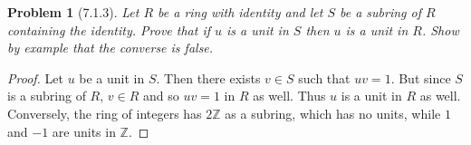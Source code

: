 \documentclass{article}
\newtheorem{problem}{Problem}
\begin{document}

\begin{problem}[7.1.3]
Let $R$ be a ring with identity and let $S$ be a subring of $R$ containing the identity. Prove that if $u$ is a unit in $S$ then $u$ is a unit in $R$. Show by example that the converse is false.
\end{problem}
\begin{proof}
Let $u$ be a unit in $S$. Then there exists $v \in S$ such that $uv = 1$. But since $S$ is a subring of $R$, $v \in R$ and so $uv = 1$ in $R$ as well. Thus $u$ is a unit in $R$ as well. Conversely, the ring of integers has $2\mathbb{Z}$ as a subring, which has no units, while $1$ and $-1$ are units in $\mathbb{Z}$.
\end{proof}
\end{document}
